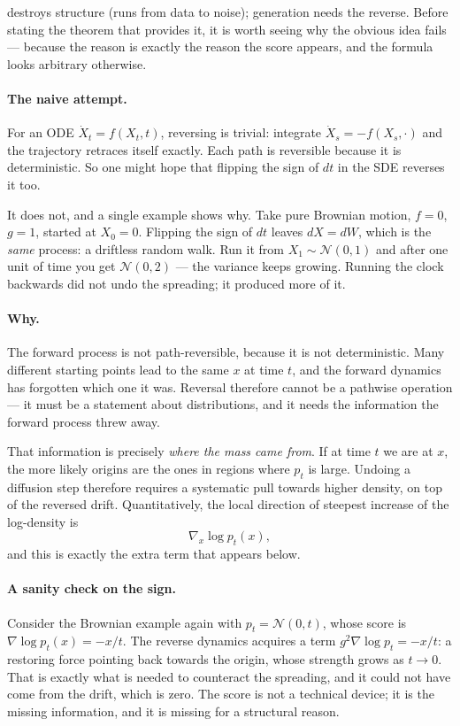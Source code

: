 \documentclass[11pt,a4paper]{report}
\theoremstyle{definition}
\theoremstyle{remark}
\begin{document}
 destroys structure (runs from data to noise);
generation needs the reverse. Before stating the theorem that provides it,
it is worth seeing why the obvious idea fails --- because the reason is
exactly the reason the score appears, and the formula looks arbitrary
otherwise.

\paragraph{The naive attempt.} For an ODE $\dot X_t = f(X_t,t)$, reversing
is trivial: integrate $\dot X_s = -f(X_s,\cdot)$ and the trajectory retraces
itself exactly. Each path is reversible because it is deterministic. So one
might hope that flipping the sign of $dt$ in the SDE reverses it too.

It does not, and a single example shows why. Take pure Brownian motion,
$f=0$, $g=1$, started at $X_0=0$. Flipping the sign of $dt$ leaves $dX =
dW$, which is the \emph{same} process: a driftless random walk. Run it from
$X_1\sim\mathcal N(0,1)$ and after one unit of time you get
$\mathcal N(0,2)$ --- the variance keeps growing. Running the clock backwards
did not undo the spreading; it produced more of it.

\paragraph{Why.} The forward process is not path-reversible, because it is
not deterministic. Many different starting points lead to the same $x$ at
time $t$, and the forward dynamics has forgotten which one it was. Reversal
therefore cannot be a pathwise operation --- it must be a statement about
distributions, and it needs the information the forward process threw away.

That information is precisely \emph{where the mass came from}. If at time
$t$ we are at $x$, the more likely origins are the ones in regions where
$p_t$ is large. Undoing a diffusion step therefore requires a systematic
pull towards higher density, on top of the reversed drift. Quantitatively,
the local direction of steepest increase of the log-density is
\[
\nabla_x\log p_t(x),
\]
and this is exactly the extra term that appears below.

\paragraph{A sanity check on the sign.} Consider the Brownian example again
with $p_t=\mathcal N(0,t)$, whose score is $\nabla\log p_t(x)=-x/t$. The
reverse dynamics acquires a term $g^2\nabla\log p_t = -x/t$: a restoring
force pointing back towards the origin, whose strength grows as $t\to0$.
That is exactly what is needed to counteract the spreading, and it could not
have come from the drift, which is zero. The score is not a technical
device; it is the missing information, and it is missing for a structural
reason.
\end{document}
